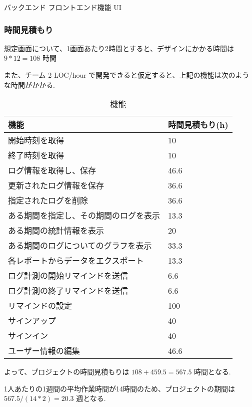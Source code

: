 バックエンド
フロントエンド機能
UI


\subsubsection{時間見積もり}

想定画面について、1画面あたり2時間とすると、デザインにかかる時間は $9 * 12 = 108$ 時間

また、チーム 2 LOC/hour で開発できると仮定すると、上記の機能は次のような時間がかかる.

\begin{table}[H]
  \centering
  \caption{機能}
  \begin{tabular}{|l|l|}
  \hline
    機能 & 時間見積もり(h) \\
  \hline

  \hline
    開始時刻を取得 & 10 \\
  \hline
    終了時刻を取得 & 10 \\
  \hline
    ログ情報を取得し、保存 & 46.6 \\
  \hline
    更新されたログ情報を保存 & 36.6 \\
  \hline
    指定されたログを削除 & 36.6 \\
  \hline

  \hline
    ある期間を指定し、その期間のログを表示 & 13.3 \\
  \hline
    ある期間の統計情報を表示 & 20 \\
  \hline
    ある期間のログについてのグラフを表示 & 33.3 \\
  \hline
    各レポートからデータをエクスポート & 13.3 \\
  \hline

  \hline
    ログ計測の開始リマインドを送信 & 6.6 \\
  \hline
    ログ計測の終了リマインドを送信 & 6.6 \\
  \hline
    リマインドの設定 & 100 \\
  \hline

  \hline
    サインアップ & 40 \\
  \hline
    サインイン & 40 \\
  \hline
    ユーザー情報の編集 & 46.6 \\
  \hline
  \end{tabular}
\end{table}

よって、プロジェクトの時間見積もりは $108 + 459.5 = 567.5$ 時間となる.

1人あたりの1週間の平均作業時間が14時間のため、プロジェクトの期間は $567.5 / (14 * 2) = 20.3$ 週となる. \\

